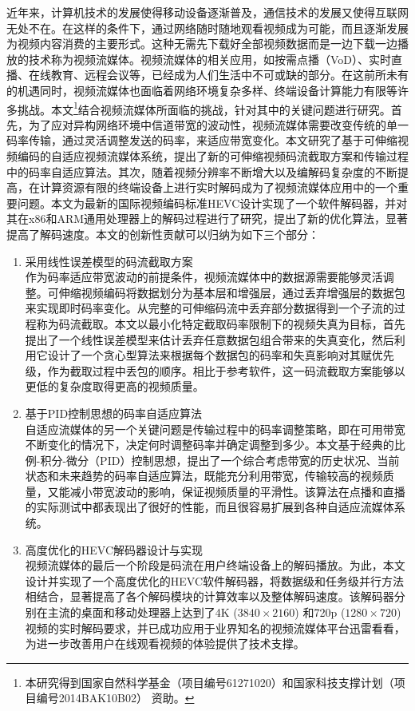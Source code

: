 \begin{cabstract}
近年来，计算机技术的发展使得移动设备逐渐普及，通信技术的发展又使得互联网无处不在。在这样的条件下，通过网络随时随地观看视频成为可能，而且逐渐发展为视频内容消费的主要形式。这种无需先下载好全部视频数据而是一边下载一边播放的技术称为视频流媒体。视频流媒体的相关应用，如按需点播（VoD）、实时直播、在线教育、远程会议等，已经成为人们生活中不可或缺的部分。在这前所未有的机遇同时，视频流媒体也面临着网络环境复杂多样、终端设备计算能力有限等许多挑战。本文\footnote{本研究得到国家自然科学基金（项目编号61271020）和国家科技支撑计划（项目编号2014BAK10B02） 资助。}结合视频流媒体所面临的挑战，针对其中的关键问题进行研究。首先，为了应对异构网络环境中信道带宽的波动性，视频流媒体需要改变传统的单一码率传输，通过灵活调整发送的码率，来适应带宽变化。本文研究了基于可伸缩视频编码的自适应视频流媒体系统，提出了新的可伸缩视频码流截取方案和传输过程中的码率自适应算法。其次，随着视频分辨率不断增大以及编解码复杂度的不断提高，在计算资源有限的终端设备上进行实时解码成为了视频流媒体应用中的一个重要问题。本文为最新的国际视频编码标准HEVC设计实现了一个软件解码器，并对其在x86和ARM通用处理器上的解码过程进行了研究，提出了新的优化算法，显著提高了解码速度。本文的创新性贡献可以归纳为如下三个部分：
\begin{enumerate}
\item {采用线性误差模型的码流截取方案}\\
作为码率适应带宽波动的前提条件，视频流媒体中的数据源需要能够灵活调整。可伸缩视频编码将数据划分为基本层和增强层，通过丢弃增强层的数据包来实现即时码率变化。从完整的可伸缩码流中丢弃部分数据得到一个子流的过程称为码流截取。本文以最小化特定截取码率限制下的视频失真为目标，首先提出了一个线性误差模型来估计丢弃任意数据包组合带来的失真变化，然后利用它设计了一个贪心型算法来根据每个数据包的码率和失真影响对其赋优先级，作为截取过程中丢包的顺序。相比于参考软件，这一码流截取方案能够以更低的复杂度取得更高的视频质量。
\item {基于PID控制思想的码率自适应算法}\\
自适应流媒体的另一个关键问题是传输过程中的码率调整策略，即在可用带宽不断变化的情况下，决定何时调整码率并确定调整到多少。本文基于经典的比例-积分-微分（PID）控制思想，提出了一个综合考虑带宽的历史状况、当前状态和未来趋势的码率自适应算法，既能充分利用带宽，传输较高的视频质量，又能减小带宽波动的影响，保证视频质量的平滑性。该算法在点播和直播的实际测试中都表现出了很好的性能，而且很容易扩展到各种自适应流媒体系统。
\item {高度优化的HEVC解码器设计与实现}\\
视频流媒体的最后一个阶段是码流在用户终端设备上的解码播放。为此，本文设计并实现了一个高度优化的HEVC软件解码器，将数据级和任务级并行方法相结合，显著提高了各个解码模块的计算效率以及整体解码速度。该解码器分别在主流的桌面和移动处理器上达到了4K ($3840 \times 2160$) 和720p ($1280 \times 720$) 视频的实时解码要求，并已成功应用于业界知名的视频流媒体平台迅雷看看，为进一步改善用户在线观看视频的体验提供了技术支撑。
\end{enumerate}
\end{cabstract}

